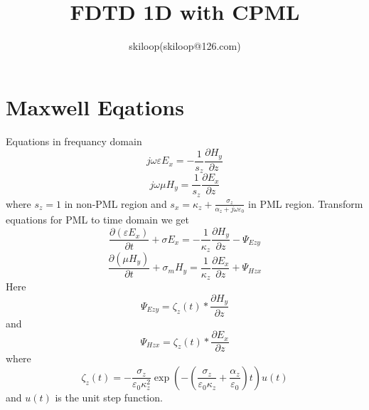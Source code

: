 \documentclass[a4paper,10pt]{article}
\title{FDTD 1D with CPML}
\author{skiloop(skiloop@126.com)}
\begin{document}
\maketitle
\section{Maxwell Eqations}
Equations in frequancy domain
\begin{equation}
j\omega\varepsilon E_{x}=-\frac{1}{s_{z}}\frac{\partial H_{y}}{\partial z}
\end{equation}
\begin{equation}
j\omega\mu H_{y}=\frac{1}{s_{z}}\frac{\partial E_{x}}{\partial z}
\end{equation}
where $s_z=1$ in non-PML region and $s_x=\kappa_z+\frac{\sigma_z}{\alpha_z+j\omega\varepsilon_0}$ in PML region.
Transform equations for PML to time domain we get
\begin{equation}
\frac{\partial( \varepsilon E_{x})}{\partial t}+\sigma E_{x}=-\frac{1}{\kappa_{z}}\frac{\partial H_{y}}{\partial z}-\Psi_{Ezy}
\end{equation}
\begin{equation}
\frac{\partial( \mu H_{y})}{\partial t}+\sigma_{m} H_{y}=\frac{1}{\kappa_{z}}\frac{\partial E_{x}}{\partial z}+\Psi_{Hzx}
\end{equation}
Here
\begin{equation}
\Psi_{Ezy}=\zeta_{z}(t)*\frac{\partial H_{y}}{\partial z}
\end{equation}
and
\begin{equation}
\Psi_{Hzx}=\zeta_{z}(t)*\frac{\partial E_{x}}{\partial z}
\end{equation}
where
\begin{equation}
\zeta_{z}(t)=-\frac{\sigma_z}{\varepsilon_0\kappa^{2}_{z}}\exp\left(-\left(\frac{\sigma_z}{\varepsilon_0\kappa_z}+\frac{\alpha_z}{\varepsilon_0}\right)t\right)u(t)
\end{equation}
and $u(t)$ is the unit step function.
\end{document}
